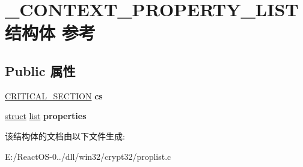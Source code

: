 \hypertarget{struct___c_o_n_t_e_x_t___p_r_o_p_e_r_t_y___l_i_s_t}{}\section{\+\_\+\+C\+O\+N\+T\+E\+X\+T\+\_\+\+P\+R\+O\+P\+E\+R\+T\+Y\+\_\+\+L\+I\+S\+T结构体 参考}
\label{struct___c_o_n_t_e_x_t___p_r_o_p_e_r_t_y___l_i_s_t}
\subsection*{Public 属性}
\begin{DoxyCompactItemize}
\item 
\mbox{\label{struct___c_o_n_t_e_x_t___p_r_o_p_e_r_t_y___l_i_s_t_a936d922745ad1c652bdc7fce4cd6fdd8}} 
\hyperlink{struct___c_r_i_t_i_c_a_l___s_e_c_t_i_o_n}{C\+R\+I\+T\+I\+C\+A\+L\+\_\+\+S\+E\+C\+T\+I\+ON} {\bfseries cs}
\item 
\mbox{\label{struct___c_o_n_t_e_x_t___p_r_o_p_e_r_t_y___l_i_s_t_a89a01508926d0c814962fa7fb726d27b}} 
\hyperlink{interfacestruct}{struct} \hyperlink{classlist}{list} {\bfseries properties}
\end{DoxyCompactItemize}


该结构体的文档由以下文件生成\+:\begin{DoxyCompactItemize}
\item 
E\+:/\+React\+O\+S-\/0../dll/win32/crypt32/proplist.\+c\end{DoxyCompactItemize}
